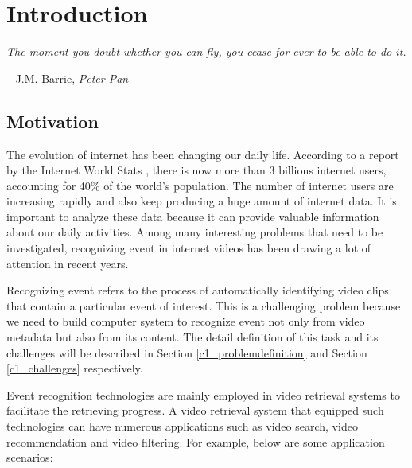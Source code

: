 \chapter{Introduction}
\label{chapter1}

\epigraph{\textit{The moment you doubt whether you can fly, you cease for ever to be able to do it.}}{ -- J.M. Barrie, \textit{Peter Pan}}


\ifpdf
    \graphicspath{{Chapter1/Figs/Raster/}{Chapter1/Figs/PDF/}{Chapter1/Figs/}}
\else
    \graphicspath{{Chapter1/Figs/Vector/}{Chapter1/Figs/}}
\fi

\section{Motivation}
The evolution of internet has been changing our daily life. According to a report by the Internet World Stats \cite{Internet1}, there is now more than 3 billions internet users, accounting for 40\% of the world's population. The number of internet users are increasing rapidly and also keep producing a huge amount of internet data. It is important to analyze these data because it can provide valuable information about our daily activities. Among many interesting problems that need to be investigated, recognizing event in internet videos has been drawing a lot of attention in recent years. 

Recognizing event refers to the process of automatically identifying video clips that contain a particular event of interest. This is a challenging problem because we need to build computer system to recognize event not only from video metadata but also from its content. The detail definition of this task and its challenges will be described in Section \ref{c1_problemdefinition} and Section \ref{c1_challenges} respectively. 

Event recognition technologies are mainly employed in video retrieval systems to facilitate the retrieving progress. A video retrieval system that equipped such technologies can have numerous applications such as video search, video recommendation and video filtering. For example, below are some application scenarios:

